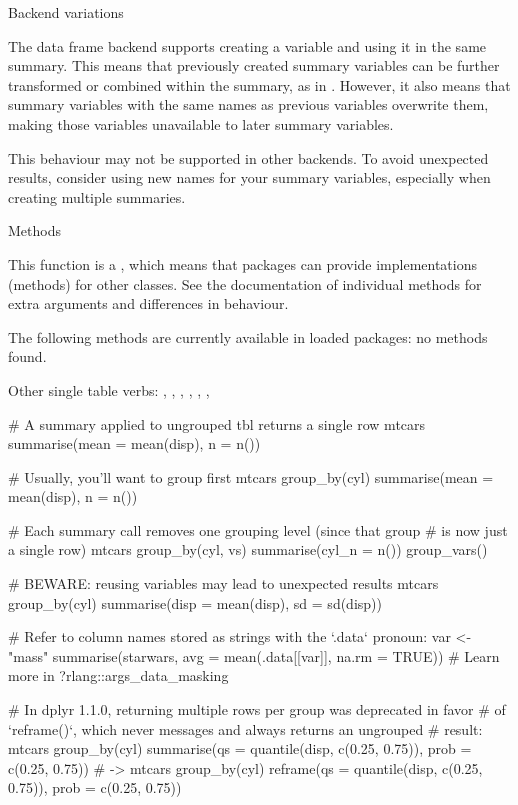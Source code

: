 \documentclass[a4paper]{book}
\begin{document}
%
\begin{Section}{Backend variations}


The data frame backend supports creating a variable and using it in the
same summary. This means that previously created summary variables can be
further transformed or combined within the summary, as in .
However, it also means that summary variables with the same names as previous
variables overwrite them, making those variables unavailable to later summary
variables.

This behaviour may not be supported in other backends. To avoid unexpected
results, consider using new names for your summary variables, especially when
creating multiple summaries.
\end{Section}
%
\begin{Section}{Methods}

This function is a , which means that packages can provide
implementations (methods) for other classes. See the documentation of
individual methods for extra arguments and differences in behaviour.

The following methods are currently available in loaded packages:
no methods found.
\end{Section}
%
\begin{SeeAlso}
Other single table verbs: 
,
,
,
,
,
,
\end{SeeAlso}
%
\begin{Examples}
\begin{ExampleCode}
# A summary applied to ungrouped tbl returns a single row
mtcars %
  summarise(mean = mean(disp), n = n())

# Usually, you'll want to group first
mtcars %
  group_by(cyl) %
  summarise(mean = mean(disp), n = n())

# Each summary call removes one grouping level (since that group
# is now just a single row)
mtcars %
  group_by(cyl, vs) %
  summarise(cyl_n = n()) %
  group_vars()

# BEWARE: reusing variables may lead to unexpected results
mtcars %
  group_by(cyl) %
  summarise(disp = mean(disp), sd = sd(disp))

# Refer to column names stored as strings with the `.data` pronoun:
var <- "mass"
summarise(starwars, avg = mean(.data[[var]], na.rm = TRUE))
# Learn more in ?rlang::args_data_masking

# In dplyr 1.1.0, returning multiple rows per group was deprecated in favor
# of `reframe()`, which never messages and always returns an ungrouped
# result:
mtcars %
   group_by(cyl) %
   summarise(qs = quantile(disp, c(0.25, 0.75)), prob = c(0.25, 0.75))
# ->
mtcars %
   group_by(cyl) %
   reframe(qs = quantile(disp, c(0.25, 0.75)), prob = c(0.25, 0.75))
\end{ExampleCode}
\end{Examples}
\end{document}
